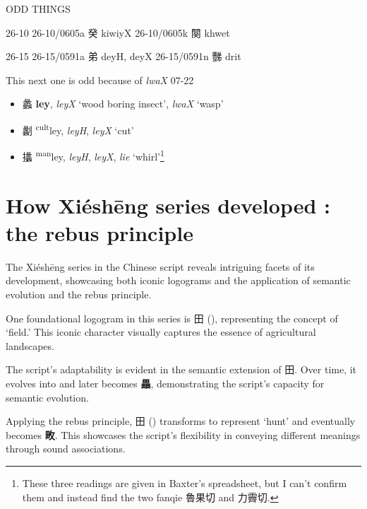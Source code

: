 ODD THINGS 

26-10
    26-10/0605a 癸 kiwiyX
    26-10/0605k 闋 khwet

26-15
    26-15/0591a 弟 deyH, deyX
    26-15/0591n 豒 drit



This next one is odd because of \textit{lwaX}
07-22


\begin{itemize}
    \item {\Large{蠡}}  %
    {\large{\textbf{ley}}},
    \textit{leyX} `wood boring insect', \textit{lwaX} `wasp'   %

    \item {\Large{劙}}  %
    {\large{{\textsuperscript{cult}}ley}},
    \textit{leyH}, \textit{leyX} `cut'   %

    \item {\Large{攭}}  %
    {\large{{\textsuperscript{man}}ley}},
    \textit{leyH}, \textit{leyX}, \textit{lie} `whirl'\footnote{These three readings are given in Baxter's spreadsheet, but I can't confirm them and instead find the two fanqie 魯果切 and 力霽切.} %
\end{itemize}




\section{How Xiéshēng series developed : the rebus principle}

The Xiéshēng series in the Chinese script reveals intriguing facets of its development, showcasing both iconic logograms and the application of semantic evolution and the rebus principle.

One foundational logogram in this series is 田 (\textit{{}}), representing the concept of `field.' This iconic character visually captures the essence of agricultural landscapes.

The script's adaptability is evident in the semantic extension of 田. Over time, it evolves into \textit{{}} and later becomes \textbf{畾}, demonstrating the script's capacity for semantic evolution.

Applying the rebus principle, 田 (\textit{{}}) transforms to represent `hunt' and eventually becomes \textbf{畋}. This showcases the script's flexibility in conveying different meanings through sound associations.

